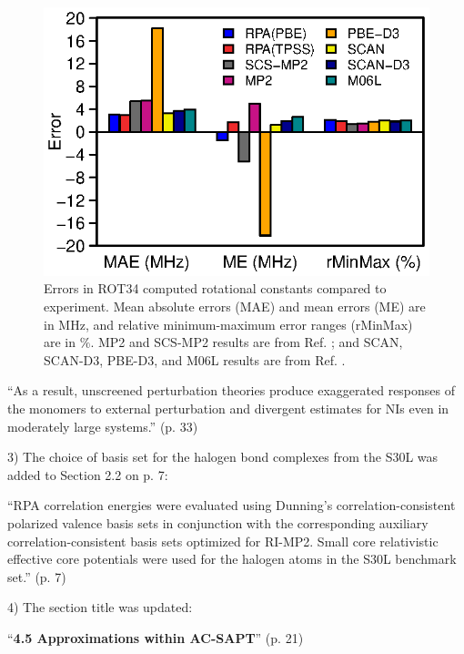 \documentclass[journal=jctcce,manuscript=article]{achemso}
\newcommand*{\rev}[1]{{\color{blue} #1}}
\begin{document}
\begin{figure}[H]
   \centering
  \includegraphics{deviate_v4.eps}
  \caption{Errors in ROT34 computed rotational constants compared to
    experiment.\cite{Risthaus14JComputChem35p1509}  
    Mean absolute errors (MAE) and mean errors (ME) are in MHz,
    and relative minimum-maximum error ranges
    (rMinMax) are in $\%$. MP2 and SCS-MP2 results are from
    Ref. ; and SCAN, SCAN-D3,
    \rev{PBE-D3}, and M06L results are from Ref. .}
  \label{fig:methods_bar}
\end{figure}

``As a result, \rev{unscreened} perturbation theories produce exaggerated
responses of the monomers to external perturbation \rev{and} divergent estimates
for NIs even in moderately large systems.'' (p. 33)

3) The choice of basis set for the halogen bond complexes from
the S30L was added to Section 2.2 on p. 7:

``RPA correlation energies were evaluated using Dunning's correlation-consistent
  polarized valence basis sets\cite{Dunning89JChemPhys90p1007,doi:10.1063/1.464303}
  in conjunction with the corresponding auxiliary correlation-consistent basis
  sets optimized for RI-MP2.\cite{Weigend02JChemPhys116p3175,b415208e}
  \rev{Small core relativistic effective core
    potentials\cite{doi:10.1063/1.1622924,doi:10.1021/jp065887l} were used for
    the halogen atoms in the S30L\cite{Sure15JChemTheoryComput} benchmark set.}''
    (p. 7)

4) The section title was updated:

``\textbf{4.5 Approximations \rev{within AC-SAPT}}'' (p. 21)
\end{document}
